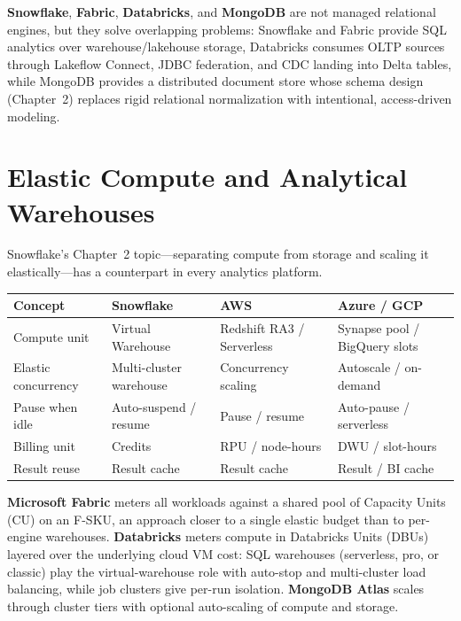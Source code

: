 \noindent \textbf{Snowflake}, \textbf{Fabric}, \textbf{Databricks}, and \textbf{MongoDB} are not
managed relational engines, but they solve overlapping problems: Snowflake and Fabric provide SQL
analytics over warehouse/lakehouse storage, Databricks consumes OLTP sources through Lakeflow
Connect, JDBC federation, and CDC landing into Delta tables, while MongoDB provides a distributed
document store whose schema design (Chapter~2) replaces rigid relational normalization with
intentional, access-driven modeling.

\section{Elastic Compute and Analytical Warehouses}
%
Snowflake's Chapter~2 topic---separating compute from storage and scaling it elastically---has a
counterpart in every analytics platform.

\begin{center}
\footnotesize
\begin{tabular}{@{}p{2.8cm}p{3.2cm}p{3.2cm}p{3.2cm}@{}}
\toprule
\textbf{Concept} & \textbf{Snowflake} & \textbf{AWS} & \textbf{Azure / GCP} \\
\midrule
Compute unit & Virtual Warehouse & Redshift RA3 / Serverless & Synapse pool / BigQuery slots \\
Elastic concurrency & Multi-cluster warehouse & Concurrency scaling & Autoscale / on-demand \\
Pause when idle & Auto-suspend / resume & Pause / resume & Auto-pause / serverless \\
Billing unit & Credits & RPU / node-hours & DWU / slot-hours \\
Result reuse & Result cache & Result cache & Result / BI cache \\
\bottomrule
\end{tabular}
\end{center}

\noindent \textbf{Microsoft Fabric} meters all workloads against a shared pool of Capacity Units
(CU) on an F-SKU, an approach closer to a single elastic budget than to per-engine warehouses.
\textbf{Databricks} meters compute in Databricks Units (DBUs) layered over the underlying cloud
VM cost: SQL warehouses (serverless, pro, or classic) play the virtual-warehouse role with
auto-stop and multi-cluster load balancing, while job clusters give per-run isolation.
\textbf{MongoDB Atlas} scales through cluster tiers with optional auto-scaling of compute and storage.

